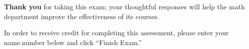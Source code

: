 \documentclass{ximera}
\begin{document}
\textbf{Thank you} for taking this exam; your thoughtful responses
will help the math department improve the effectiveness of its
courses.

In order to receive credit for completing this assessment, please enter your name.number below and click ``Finish Exam.''

\begin{question}
\end{question}
\end{document}

